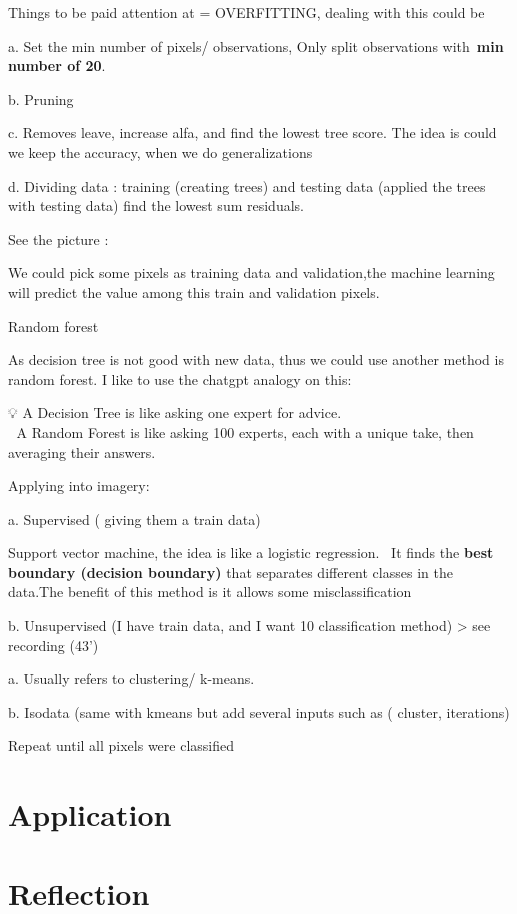 \documentclass[
  letterpaper,
  DIV=11,
  numbers=noendperiod]{scrreprt}
\begin{document}
Things to be paid attention at = OVERFITTING, dealing with this could be

a. Set the min number of pixels/ observations, Only split observations
with~\textbf{min number of 20}.

b. Pruning

c. Removes leave, increase alfa, and find the lowest tree score. The
idea is could we keep the accuracy, when we do generalizations

d. Dividing data : training (creating trees) and testing data (applied
the trees with testing data) find the lowest sum residuals.

See the picture :

We could pick some pixels as training data and validation,the machine
learning will predict the value among this train and validation pixels.

Random forest

As decision tree is not good with new data, thus we could use another
method is random forest. I like to use the chatgpt analogy on this:

💡 A Decision Tree is like asking one expert for advice.\\
🌲 A Random Forest is like asking 100 experts, each with a unique take,
then averaging their answers.

Applying into imagery:

a. Supervised ( giving them a train data)

Support vector machine, the idea is like a logistic regression. ~It
finds the \textbf{best boundary (decision boundary)} that separates
different classes in the data.The benefit of this method is it allows
some misclassification

b. Unsupervised (I have train data, and I want 10 classification method)
\textgreater{} see recording (43')

a. Usually refers to clustering/ k-means.

b. Isodata (same with kmeans but add several inputs such as ( cluster,
iterations)

Repeat until all pixels were classified

\hypertarget{application-4}{%
\section{Application}\label{application-4}}

\hypertarget{reflection-3}{%
\section{Reflection}\label{reflection-3}}
\end{document}
